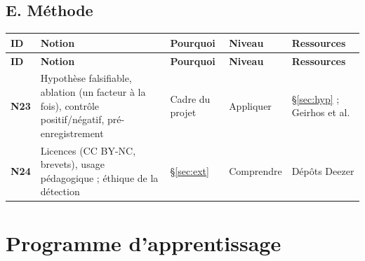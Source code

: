 \documentclass[11pt,a4paper]{article}
\begin{document}
\subsection{E. Méthode}
{\footnotesize
\begin{longtable}{L{0.95cm}L{4.1cm}L{4.6cm}L{2.2cm}L{3.3cm}}
\toprule
\textbf{ID} & \textbf{Notion} & \textbf{Pourquoi} & \textbf{Niveau} & \textbf{Ressources}\\
\midrule
\endfirsthead
\toprule
\textbf{ID} & \textbf{Notion} & \textbf{Pourquoi} & \textbf{Niveau} & \textbf{Ressources}\\
\midrule
\endhead
\bottomrule
\endfoot
\textbf{N23} & Hypothèse falsifiable, ablation (un facteur à la fois), contrôle positif/négatif, pré-enregistrement & Cadre du projet & Appliquer & §\ref{sec:hyp} ; Geirhos et al.\\
\addlinespace
\textbf{N24} & Licences (CC BY-NC, brevets), usage pédagogique ; éthique de la détection & §\ref{sec:ext} & Comprendre & Dépôts Deezer\\
\end{longtable}}
\section{Programme d'apprentissage}\label{sec:prog}
\end{document}
